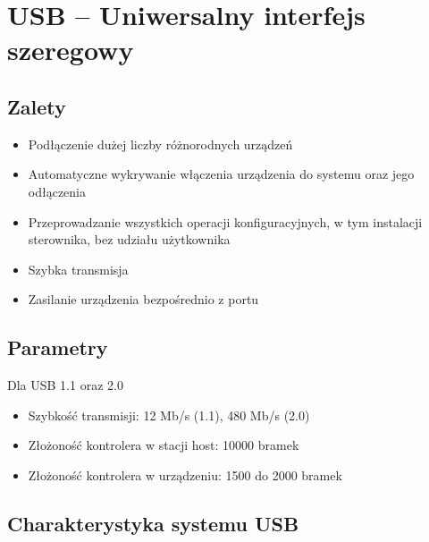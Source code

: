 
\section{USB – Uniwersalny interfejs szeregowy}
	\subsection{Zalety}
	\begin{itemize}
		\item Podłączenie dużej liczby różnorodnych urządzeń
		\item Automatyczne wykrywanie włączenia urządzenia do systemu oraz jego odłączenia
		\item Przeprowadzanie wszystkich operacji konfiguracyjnych, w tym instalacji sterownika, bez udziału użytkownika
		\item Szybka transmisja
		\item Zasilanie urządzenia bezpośrednio z portu
	\end{itemize}
	\subsection{Parametry}
	Dla USB 1.1 oraz 2.0
	\begin{itemize}
		\item Szybkość transmisji: 12 Mb/s (1.1), 480 Mb/s (2.0)
		\item Złożoność kontrolera w stacji host: 10000 bramek
		\item Złożoność kontrolera w urządzeniu: 1500 do 2000 bramek
	\end{itemize}
	\subsection{Charakterystyka systemu USB}
